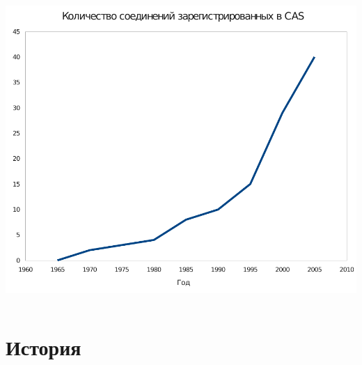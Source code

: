 \begin{frame}
\begin{columns}
\begin{column}{0.5\textwidth}
     \includegraphics[scale=0.35]{images/graph.pdf}
   \end{column}
 \end{columns}


\end{frame}

\section{История}

